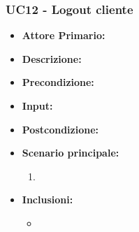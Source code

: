 \subsubsection{UC12 - Logout cliente}
\begin{itemize}
    \item \textbf{Attore Primario:} 
    \item \textbf{Descrizione:}
    \item \textbf{Precondizione:}
    \item \textbf{Input:}
    \item \textbf{Postcondizione:}
    \item \textbf{Scenario principale:}
    \begin{enumerate}
        \item 
    \end{enumerate}
    \item \textbf{Inclusioni:}
    \begin{itemize}
        \item
    \end{itemize}
\end{itemize}